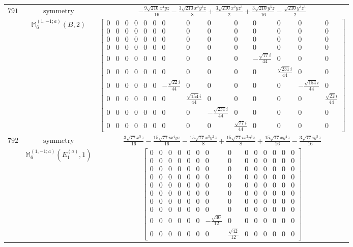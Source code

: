 \documentclass[fleqn,8pt,landscape]{jsarticle}
\begin{document}
\begin{longtable}{ccc}
$ 791 $ & $ \text{symmetry} $ & $ - \frac{9 \sqrt{210} x^{4} y z}{16} - \frac{3 \sqrt{210} x^{2} y^{3} z}{8} + \frac{3 \sqrt{210} x^{2} y z^{3}}{2} + \frac{3 \sqrt{210} y^{5} z}{16} - \frac{\sqrt{210} y^{3} z^{3}}{2} $ \\
$  $ & $ \mathbb{M}_{6}^{(1,-1;a)}(B,2) $ & $ \begin{bmatrix} 0 & 0 & 0 & 0 & 0 & 0 & 0 & 0 & 0 & 0 & 0 & 0 & 0 & 0 \\ 0 & 0 & 0 & 0 & 0 & 0 & 0 & 0 & 0 & 0 & 0 & 0 & 0 & 0 \\ 0 & 0 & 0 & 0 & 0 & 0 & 0 & 0 & 0 & 0 & 0 & 0 & 0 & 0 \\ 0 & 0 & 0 & 0 & 0 & 0 & 0 & 0 & 0 & 0 & 0 & 0 & 0 & 0 \\ 0 & 0 & 0 & 0 & 0 & 0 & 0 & 0 & 0 & 0 & - \frac{\sqrt{77} i}{44} & 0 & 0 & 0 \\ 0 & 0 & 0 & 0 & 0 & 0 & 0 & 0 & 0 & 0 & 0 & \frac{\sqrt{231} i}{44} & 0 & 0 \\ 0 & 0 & 0 & 0 & 0 & 0 & - \frac{\sqrt{22} i}{44} & 0 & 0 & 0 & 0 & 0 & - \frac{\sqrt{154} i}{44} & 0 \\ 0 & 0 & 0 & 0 & 0 & 0 & 0 & \frac{\sqrt{154} i}{44} & 0 & 0 & 0 & 0 & 0 & \frac{\sqrt{22} i}{44} \\ 0 & 0 & 0 & 0 & 0 & 0 & 0 & 0 & - \frac{\sqrt{231} i}{44} & 0 & 0 & 0 & 0 & 0 \\ 0 & 0 & 0 & 0 & 0 & 0 & 0 & 0 & 0 & \frac{\sqrt{77} i}{44} & 0 & 0 & 0 & 0 \end{bmatrix} $ \\ \hline
$ 792 $ & $ \text{symmetry} $ & $ \frac{3 \sqrt{77} x^{5} z}{16} - \frac{15 \sqrt{77} i x^{4} y z}{16} - \frac{15 \sqrt{77} x^{3} y^{2} z}{8} + \frac{15 \sqrt{77} i x^{2} y^{3} z}{8} + \frac{15 \sqrt{77} x y^{4} z}{16} - \frac{3 \sqrt{77} i y^{5} z}{16} $ \\
$  $ & $ \mathbb{M}_{6}^{(1,-1;a)}(E_{1}^{(a)},1) $ & $ \begin{bmatrix} 0 & 0 & 0 & 0 & 0 & 0 & 0 & 0 & 0 & 0 & 0 & 0 & 0 & 0 \\ 0 & 0 & 0 & 0 & 0 & 0 & 0 & 0 & 0 & 0 & 0 & 0 & 0 & 0 \\ 0 & 0 & 0 & 0 & 0 & 0 & 0 & 0 & 0 & 0 & 0 & 0 & 0 & 0 \\ 0 & 0 & 0 & 0 & 0 & 0 & 0 & 0 & 0 & 0 & 0 & 0 & 0 & 0 \\ 0 & 0 & 0 & 0 & 0 & 0 & 0 & 0 & 0 & 0 & 0 & 0 & 0 & 0 \\ 0 & 0 & 0 & 0 & 0 & 0 & 0 & 0 & 0 & 0 & 0 & 0 & 0 & 0 \\ 0 & 0 & 0 & 0 & 0 & 0 & 0 & 0 & 0 & 0 & 0 & 0 & 0 & 0 \\ 0 & 0 & 0 & 0 & 0 & 0 & 0 & 0 & 0 & 0 & 0 & 0 & 0 & 0 \\ 0 & 0 & 0 & 0 & 0 & 0 & - \frac{\sqrt{30}}{12} & 0 & 0 & 0 & 0 & 0 & 0 & 0 \\ 0 & 0 & 0 & 0 & 0 & 0 & 0 & \frac{\sqrt{42}}{12} & 0 & 0 & 0 & 0 & 0 & 0 \end{bmatrix} $ \\ \hline

\end{longtable}
\end{document}
